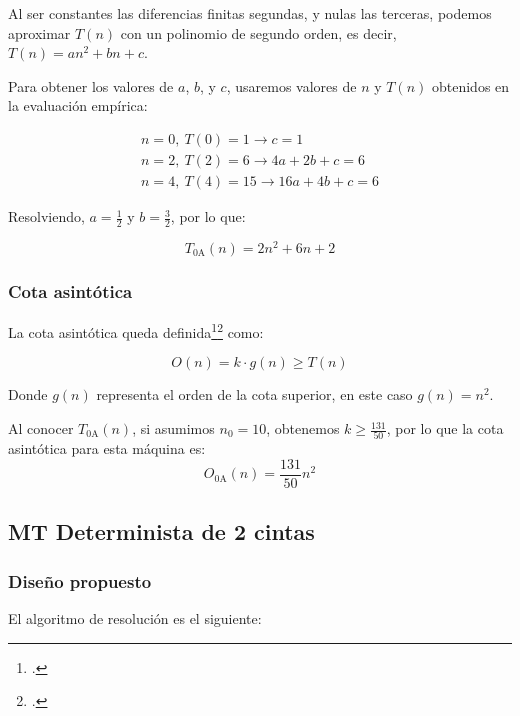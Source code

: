 Al ser constantes las diferencias finitas segundas, y nulas las terceras, podemos aproximar $T(n)$ con un polinomio de segundo orden, es decir, $T(n) = an^2 + bn + c$.\medskip

Para obtener los valores de $a$, $b$, y $c$, usaremos valores de $n$ y $T(n)$ obtenidos en la evaluación empírica:

\begin{gather*}
    n = 0,\ T(0) = 1 \rightarrow c = 1 \\
    n = 2,\ T(2) = 6 \rightarrow 4a + 2b + c = 6 \\
    n = 4,\ T(4) = 15 \rightarrow 16a + 4b + c = 6
\end{gather*}

Resolviendo, $a=\frac{1}{2}$ y $b=\frac{3}{2}$, por lo que:

\begin{equation}
    T_{\mathrm{0A}}(n) = 2n^2 + 6n + 2
\end{equation}


\subsubsection*{Cota asintótica}
La cota asintótica queda definida\footcite[ver][pg. 277: \textit{Definition 7.2}]{SipserMichael2013Ittt}\footcite[ver][pg. 97: \textit{Definition of Big-Oh}]{aho1994foundations} como:

\begin{equation}
    O(n) = k \cdot g(n) \geq T(n)
    \label{eq:On}
\end{equation}

Donde $g(n)$ representa el orden de la cota superior, en este caso $g(n) = n^2$.\medskip

Al conocer $T_{\mathrm{0A}}(n)$, si asumimos $n_0 = 10$, obtenemos $k \geq \frac{131}{50}$, por lo que la cota asintótica para esta máquina es:
\begin{equation}
    O_{\mathrm{0A}}(n) = \frac{131}{50} n^2
\end{equation}





\subsection{MT Determinista de 2 cintas}

\subsubsection*{Diseño propuesto}
El algoritmo de resolución es el siguiente:

